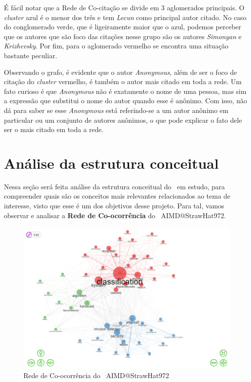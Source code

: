 É fácil notar que a Rede de Co-citação se divide em 3 aglomerados principais. O \textit{cluster} azul é o menor dos três e tem \textit{Lecun} como principal autor citado. No caso do conglomerado verde, que é ligeiramente maior que o azul, podemos perceber que os autores que são foco das citações nesse grupo são os autores \textit{Simonyan} e \textit{Krizhevsky}. Por fim, para o aglomerado vermelho se encontra uma situação bastante peculiar.

Observando o grafo, é evidente que o autor \textit{Anonymous}, além de ser o foco de citação do \textit{cluster} vermelho, é também o autor mais citado em toda a rede. Um fato curioso é que \textit{Anonymous} não é exatamente o nome de uma pessoa, mas sim a expressão que substitui o nome do autor quando esse é anônimo. Com isso, não dá para saber se esse \textit{Anonymous} está referindo-se a um autor anônimo em particular ou um conjunto de autores anônimos, o que pode explicar o fato dele ser o mais citado em toda a rede.

\section{Análise da estrutura conceitual}

Nessa seção será feita análise da estrutura conceitual do \dataset\ em estudo, para compreender quais são os conceitos mais relevantes relacionados ao tema de interesse, visto que esse é um dos objetivos desse projeto. Para tal, vamos observar e analisar a \textbf{Rede de Co-ocorrência} do \dataset\ AIMD@StrawHat972.

\begin{figure}[H]
    \centering
    \includegraphics[width=1\textwidth]{experiments/StrawHat972/PesqBibliogr/IA-DeteccaoMalware/WoS-20220209/Imagens/AIMDCooccurrenceNetwork.png}
    \caption{Rede de Co-ocorrência do \dataset\ AIMD@StrawHat972}
    \label{fig:StrawHat972:CooccurenceNet}
\end{figure}

